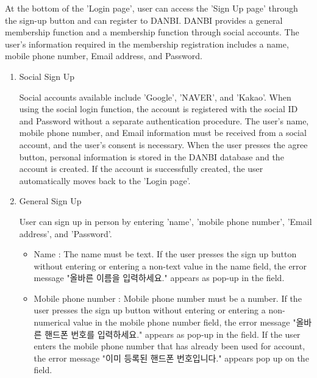 \documentclass[conference]{IEEEtran}
\begin{document}
\begin{itemize}
 At the bottom of the 'Login page', user can access the 'Sign Up page' through the sign-up button and can register to DANBI. DANBI provides a general membership function and a membership function through social accounts. The user's information required in the membership registration includes a name, mobile phone number, Email address, and Password.
\begin{enumerate}
\setlength{\parindent}{2ex}
\item Social Sign Up

Social accounts available include 'Google', 'NAVER', and 'Kakao'. When using the social login function, the account is registered with the social ID and Password without a separate authentication procedure. The user's name, mobile phone number, and Email information must be received from a social account, and the user's consent is necessary. When the user presses the agree button, personal information is stored in the DANBI database and the account is created. If the account is successfully created, the user automatically moves back to the 'Login page'.
\item General Sign Up

User can sign up in person by entering 'name', 'mobile phone number', 'Email address', and 'Password'.
\begin{itemize}
\item Name : The name must be text. If the user presses the sign up button without entering or entering a non-text value in the name field, the error message "올바른 이름을 입력하세요." appears as pop-up in the field.

\item Mobile phone number : Mobile phone number must be a number. If the user presses the sign up button without entering or entering a non-numerical value in the mobile phone number field, the error message "올바른 핸드폰 번호를 입력하세요." appears as pop-up in the field. If the user enters the mobile phone number that has already been used for account, the error message "이미 등록된 핸드폰 번호입니다." appears pop up on the field.


\end{itemize}
\end{enumerate}
\end{itemize}
\end{document}
